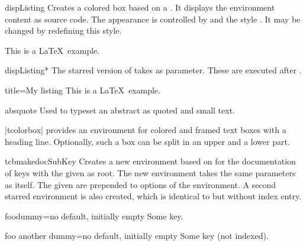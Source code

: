 \clearpage
\begin{docEnvironment}{dispListing}{}
  Creates a colored box based on a .
  It displays the environment content as source code.
  The appearance is controlled by 
  and the style . It may be
  changed by redefining this style.
\begin{dispExample}
\begin{dispListing}
This is a \LaTeX\ example.
\end{dispListing}
\end{dispExample}
\end{docEnvironment}

\begin{docEnvironment}{dispListing*}{}
  The starred version of  takes  
  as parameter. These  are executed after .
\begin{dispExample}
\begin{dispListing*}{title=My listing}
This is a \LaTeX\ example.
\end{dispListing*}
\end{dispExample}
\end{docEnvironment}


\begin{docEnvironment}{absquote}{}
  Used to typeset an abstract as quoted and small text.
\begin{dispExample}
\begin{absquote}
|tcolorbox| provides an environment for colored and framed text boxes with a
heading line. Optionally, such a box can be split in an upper and a lower part.
\end{absquote}
\end{dispExample}
\end{docEnvironment}

\clearpage
\begin{docCommand}[doc updated=2023-12-01]{tcbmakedocSubKey}{}
  Creates a new environment  based on  for the
  documentation of keys with the given  as root.
  The new environment  takes the same para\-meters as  itself.
  The given  are prepended to options of the  environment.
  A second starred environment  is also created, which is identical
  to  but without index entry.
\begin{dispExample}

\begin{docFooKey}{foodummy}{=}{no default, initially empty}
Some key.
\end{docFooKey}

\begin{docFooKey*}{foo another dummy}{=}{no default, initially empty}
Some key (not indexed).
\end{docFooKey*}
\end{dispExample}
\end{docCommand}


